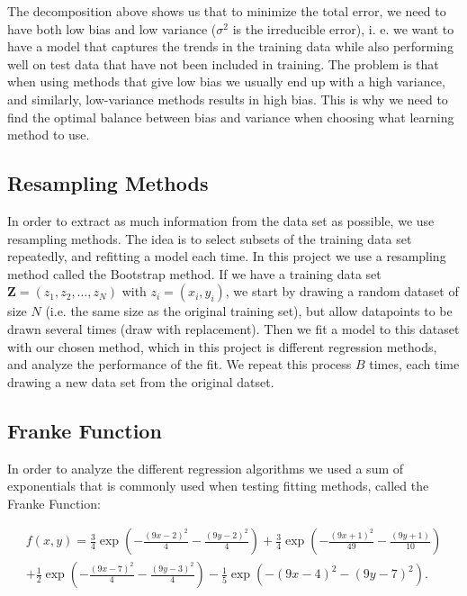 The decomposition above shows us that to minimize the total error, we need to have both low bias and low variance ($\sigma^2$ is the irreducible error), i. e. we want to have a model that captures the trends in the training data while also performing well on test data that have not been included in training. The problem is that when using methods that give low bias we usually end up with a high variance, and similarly, low-variance methods results in high bias. This is why we need to find the optimal balance between bias and variance when choosing what learning method to use.


\subsection{Resampling Methods}

In order to extract as much information from the data set as possible, we use resampling methods. The idea is to select subsets of the training data set repeatedly, and refitting a model each time. In this project we use a resampling method called the Bootstrap method. If we have a training data set $\boldsymbol{Z} = (z_1, z_2, \dots, z_N)$ with $z_i = (x_i, y_i)$, we start by drawing a random dataset of size $N$ (i.e. the same size as the original training set), but allow datapoints to be drawn several times (draw with replacement). Then we fit a model to this dataset with our chosen method, which in this project is different regression methods, and analyze the performance of the fit. We repeat this process $B$ times, each time drawing a new data set from the original datset.


\subsection{Franke Function}

In order to analyze the different regression algorithms we used a sum of exponentials that is commonly used when testing fitting methods, called the Franke Function\cite{franke}:

\begin{multline}
\label{eq:franke}
f(x,y) = \frac{3}{4}\exp{\left(-\frac{(9x-2)^2}{4} - \frac{(9y-2)^2}{4}\right)}+\frac{3}{4}\exp{\left(-\frac{(9x+1)^2}{49}- \frac{(9y+1)}{10}\right)} \\
+\frac{1}{2}\exp{\left(-\frac{(9x-7)^2}{4} - \frac{(9y-3)^2}{4}\right)} -\frac{1}{5}\exp{\left(-(9x-4)^2 - (9y-7)^2\right) }.
\end{multline}

